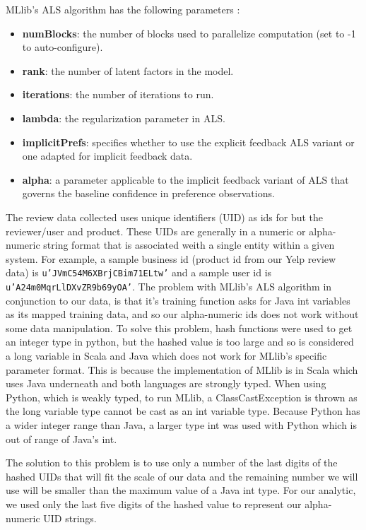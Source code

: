 \documentclass[conference]{IEEEtran}
\begin{document}
MLlib's ALS algorithm has the following parameters \cite{ApacheSpark}:

\begin{itemize}
    \item {\bf numBlocks}: the number of blocks used to parallelize computation (set to -1 to auto-configure).
    \item {\bf rank}: the number of latent factors in the model.
    \item {\bf iterations}: the number of iterations to run.
    \item {\bf lambda}: the regularization parameter in ALS.
    \item {\bf implicitPrefs}: specifies whether to use the explicit feedback ALS variant or one adapted for implicit feedback data.
    \item {\bf alpha}: a parameter applicable to the implicit feedback variant of ALS that governs the baseline confidence in preference observations.
\end{itemize}

The review data collected uses unique identifiers (UID) as ids for but the reviewer/user and product.  These UIDs are generally in a numeric or alpha-numeric string format that is associated weith a single entity within a given system.  For example, a sample business id (product id from our Yelp review data) is {\tt u’JVmC54M6XBrjCBim71ELtw’} and a sample user id is {\tt u’A24m0MqrLlDXvZR9b69yOA’}. 
The problem with MLlib's ALS algorithm in conjunction to our data, is that it's training function asks for Java int variables as its mapped training data, and so our alpha-numeric ids does not work without some data manipulation.  To solve this problem, hash functions were used to get an integer type in python, but the hashed value is too large and so is considered a long variable in Scala and Java which does not work for MLlib's specific parameter format.  This is because the implementation of MLlib is in Scala which uses Java underneath and both languages are strongly typed. When using Python, which is weakly typed, to run MLlib, a ClassCastException is thrown as the long variable type cannot be cast as an int variable type. Because Python has a wider integer range than Java, a larger type int was used with Python which is out of range of Java's int.

The solution to this problem is to use only a number of the last digits of the hashed UIDs that will fit the scale of our data and the remaining number we will use will be smaller than the maximum value of a Java int type.  For our analytic, we used only the last five digits of the hashed value to represent our alpha-numeric UID strings.   
\end{document}
